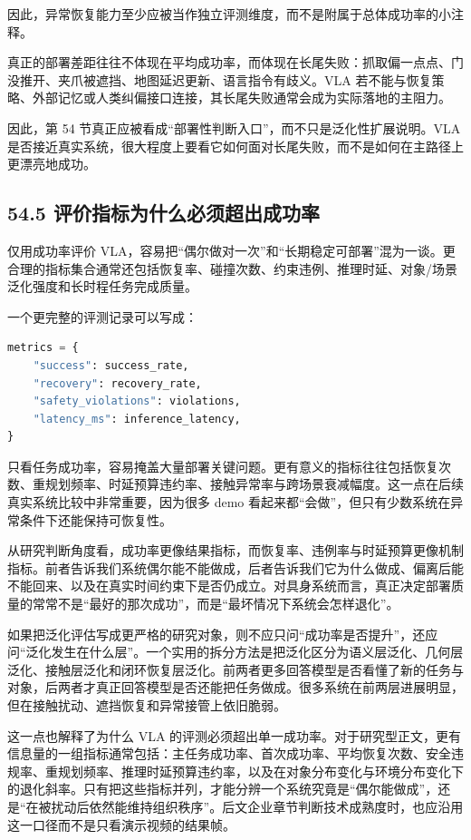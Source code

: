 因此，异常恢复能力至少应被当作独立评测维度，而不是附属于总体成功率的小注释。

真正的部署差距往往不体现在平均成功率，而体现在长尾失败：抓取偏一点点、门没推开、夹爪被遮挡、地图延迟更新、语言指令有歧义。VLA 若不能与恢复策略、外部记忆或人类纠偏接口连接，其长尾失败通常会成为实际落地的主阻力。

因此，第 54 节真正应被看成“部署性判断入口”，而不只是泛化性扩展说明。VLA 是否接近真实系统，很大程度上要看它如何面对长尾失败，而不是如何在主路径上更漂亮地成功。

\subsection*{54.5 评价指标为什么必须超出成功率}


仅用成功率评价 VLA，容易把“偶尔做对一次”和“长期稳定可部署”混为一谈。更合理的指标集合通常还包括恢复率、碰撞次数、约束违例、推理时延、对象/场景泛化强度和长时程任务完成质量。

一个更完整的评测记录可以写成：

\begin{lstlisting}[language=python]
metrics = {
    "success": success_rate,
    "recovery": recovery_rate,
    "safety_violations": violations,
    "latency_ms": inference_latency,
}
\end{lstlisting}

只看任务成功率，容易掩盖大量部署关键问题。更有意义的指标往往包括恢复次数、重规划频率、时延预算违约率、接触异常率与跨场景衰减幅度。这一点在后续真实系统比较中非常重要，因为很多 demo 看起来都“会做”，但只有少数系统在异常条件下还能保持可恢复性。

从研究判断角度看，成功率更像结果指标，而恢复率、违例率与时延预算更像机制指标。前者告诉我们系统偶尔能不能做成，后者告诉我们它为什么做成、偏离后能不能回来、以及在真实时间约束下是否仍成立。对具身系统而言，真正决定部署质量的常常不是“最好的那次成功”，而是“最坏情况下系统会怎样退化”。

如果把泛化评估写成更严格的研究对象，则不应只问“成功率是否提升”，还应问“泛化发生在什么层”。一个实用的拆分方法是把泛化区分为语义层泛化、几何层泛化、接触层泛化和闭环恢复层泛化。前两者更多回答模型是否看懂了新的任务与对象，后两者才真正回答模型是否还能把任务做成。很多系统在前两层进展明显，但在接触扰动、遮挡恢复和异常接管上依旧脆弱。

这一点也解释了为什么 VLA 的评测必须超出单一成功率。对于研究型正文，更有信息量的一组指标通常包括：主任务成功率、首次成功率、平均恢复次数、安全违规率、重规划频率、推理时延预算违约率，以及在对象分布变化与环境分布变化下的退化斜率。只有把这些指标并列，才能分辨一个系统究竟是“偶尔能做成”，还是“在被扰动后依然能维持组织秩序”。后文企业章节判断技术成熟度时，也应沿用这一口径而不是只看演示视频的结果帧。

